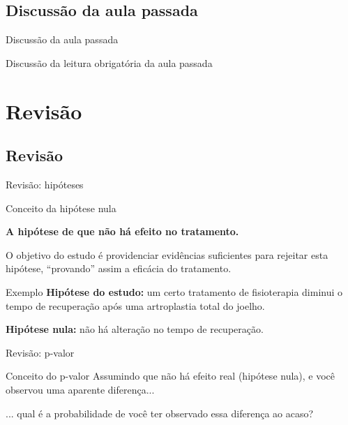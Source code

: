 \documentclass{beamer}
\begin{document}
\subsection{Discussão da aula passada}

\begin{frame}{Discussão da aula passada}
  \begin{block}{}
    Discussão da leitura obrigatória da aula passada
  \end{block}
\end{frame}

\section{Revisão}

\subsection{Revisão}

\begin{frame}{Revisão: hipóteses}
  \begin{block}{Conceito da hipótese nula}
    \begin{center}
      {\bf A hipótese de que não há efeito no tratamento.}
    \end{center}

    \bigskip
    \small
    O objetivo do estudo é providenciar evidências suficientes para rejeitar esta hipótese, ``provando'' assim a eficácia do tratamento.
  \end{block}
  \begin{exampleblock}{Exemplo}
    \small
    {\bf Hipótese do estudo:} um certo tratamento de fisioterapia diminui o tempo de recuperação após uma artroplastia total do joelho.

    \bigskip
    {\bf Hipótese nula:} não há alteração no tempo de recuperação.
  \end{exampleblock}
\end{frame}

\begin{frame}{Revisão: p-valor}
  \begin{block}{Conceito do p-valor}
    Assumindo que não há efeito real (hipótese nula), e você observou uma aparente diferença...

    \bigskip
    \begin{block}{}
      ... qual é a probabilidade de você ter observado essa diferença ao acaso?
    \end{block}
  \end{block}
\end{frame}
\end{document}
